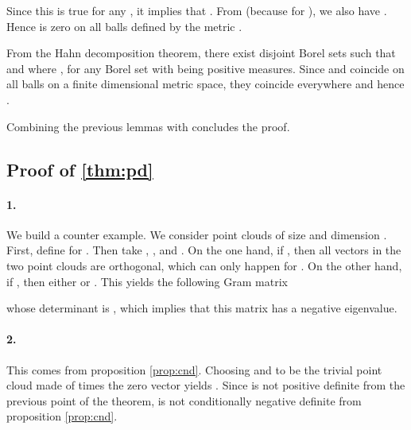 \documentclass[letterpaper]{article} \usepackage{aaai22}  \usepackage{times}  \usepackage{helvet}  \usepackage{courier}  \usepackage[hyphens]{url}  \usepackage{graphicx} \urlstyle{rm} \def\UrlFont{\rm}  \usepackage{natbib}  \usepackage{caption} \DeclareCaptionStyle{ruled}{labelfont=normalfont,labelsep=colon,strut=off} \frenchspacing  \setlength{\pdfpagewidth}{8.5in}  \setlength{\pdfpageheight}{11in}  \usepackage{algorithm}
\begin{document}
Since this is true for any , it implies that . From  (because  for ), we also have . Hence  is zero on all balls defined by the metric .

From the Hahn decomposition theorem, there exist disjoint Borel sets  such that  and  where ,  for any Borel set  with  being positive measures. Since  and  coincide on all balls on a finite dimensional metric space, they coincide everywhere \cite{hoffmann1976measures} and hence .



\begin{flushright}

\end{flushright}

Combining the previous lemmas with  concludes the proof. 
\begin{flushright}

\end{flushright}




\subsection{Proof of \cref{thm:pd}}\label{sec:proof-pd}


\paragraph{1.} We build a counter example. We consider  point clouds of size  and dimension . First, define  for . Then take , ,  and .
On the one hand, if , then all vectors in the two point clouds are orthogonal, which can only happen for . On the other hand, if , then either  or . This yields the following Gram matrix

whose determinant is , which implies that this matrix has a negative eigenvalue.


\paragraph{2.} This comes from proposition \cref{prop:cnd}. Choosing  and  to be the trivial point cloud made of  times the zero vector yields . Since  is not positive definite from the previous point of the theorem,  is not conditionally negative definite from proposition \cref{prop:cnd}.

\begin{flushright}

\end{flushright}
\end{document}

